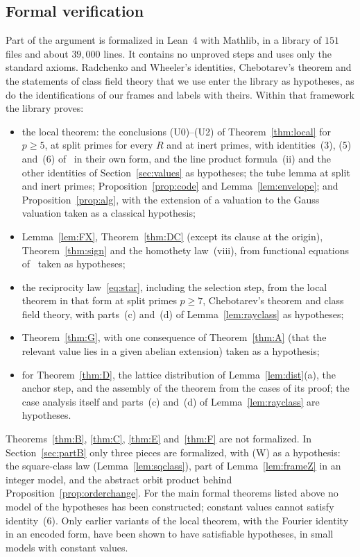 \documentclass[11pt]{amsart}
\numberwithin{equation}{section}
\theoremstyle{plain}
\theoremstyle{definition}
\theoremstyle{remark}
\begin{document}
\subsection*{Formal verification}
Part of the argument is formalized in Lean~4 with Mathlib, in a library of $151$ files and about $39{,}000$ lines. It contains no unproved steps and uses only the standard axioms. Radchenko and Wheeler's identities, Chebotarev's theorem and the statements of class field theory that we use enter the library as hypotheses, as do the identifications of our frames and labels with theirs. Within that framework the library proves:
\begin{itemize}
\item the local theorem: the conclusions (U0)--(U2) of Theorem~\ref{thm:local} for $p\ge5$, at split primes for every $R$ and at inert primes, with identities~(3), (5) and~(6) of~\cite{RW} in their own form, and the line product formula~(ii) and the other identities of Section~\ref{sec:values} as hypotheses; the tube lemma at split and inert primes; Proposition~\ref{prop:code} and Lemma~\ref{lem:envelope}; and Proposition~\ref{prop:alg}, with the extension of a valuation to the Gauss valuation taken as a classical hypothesis;
\item Lemma~\ref{lem:FX}, Theorem~\ref{thm:DC} (except its clause at the origin), Theorem~\ref{thm:sign} and the homothety law~(viii), from functional equations of~\cite{RW} taken as hypotheses;
\item the reciprocity law~\eqref{eq:star}, including the selection step, from the local theorem in that form at split primes $p\ge7$, Chebotarev's theorem and class field theory, with parts~(c) and~(d) of Lemma~\ref{lem:rayclass} as hypotheses;
\item Theorem~\ref{thm:G}, with one consequence of Theorem~\ref{thm:A} (that the relevant value lies in a given abelian extension) taken as a hypothesis;
\item for Theorem~\ref{thm:D}, the lattice distribution of Lemma~\ref{lem:dist}(a), the anchor step, and the assembly of the theorem from the cases of its proof; the case analysis itself and parts~(c) and~(d) of Lemma~\ref{lem:rayclass} are hypotheses.
\end{itemize}
Theorems~\ref{thm:B}, \ref{thm:C}, \ref{thm:E} and~\ref{thm:F} are not formalized.
In Section~\ref{sec:partB} only three pieces are formalized, with (W) as a hypothesis: the square-class law (Lemma~\ref{lem:sqclass}), part of Lemma~\ref{lem:frameZ} in an integer model, and the abstract orbit product behind Proposition~\ref{prop:orderchange}. For the main formal theorems listed above no model of the hypotheses has been constructed; constant values cannot satisfy identity~(6). Only earlier variants of the local theorem, with the Fourier identity in an encoded form, have been shown to have satisfiable hypotheses, in small models with constant values.
\end{document}
